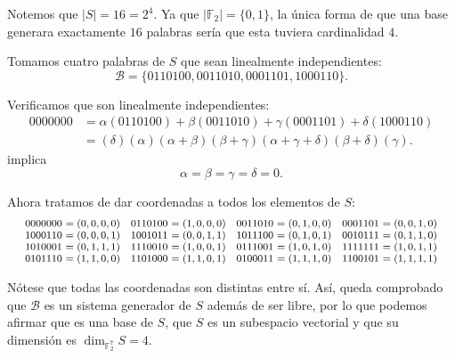 Notemos que $|S| = 16 = 2^4$. Ya que $|\mathbb{F}_2| = \{0, 1\}$, la única forma de que una base generara exactamente $16$ palabras sería que esta tuviera cardinalidad $4$.

Tomamos cuatro palabras de $S$ que sean linealmente independientes:
\[\mathcal{B} = \{0110100, 0011010, 0001101, 1000110\}.\]

Verificamos que son linealmente independientes:
\begin{align*}
	0000000 &= \alpha(0110100) + \beta(0011010) + \gamma(0001101) + \delta(1000110)\\
	&= (\delta)(\alpha)(\alpha+\beta)(\beta+\gamma)(\alpha+\gamma+\delta)(\beta+\delta)(\gamma).
\end{align*}
implica
\[\alpha=\beta=\gamma=\delta=0.\]

Ahora tratamos de dar coordenadas a todos los elementos de $S$:
\[
	\footnotesize
	\begin{array}{r@{\ }l@{\quad}r@{\ }l@{\quad}r@{\ }l@{\quad}r@{\ }l}
		0000000&=(0,0,0,0) & 0110100&=(1,0,0,0) & 0011010&=(0,1,0,0) & 0001101&=(0,0,1,0)\\
		1000110&=(0,0,0,1) & 1001011&=(0,0,1,1) & 1011100&=(0,1,0,1) & 0010111&=(0,1,1,0)\\
		1010001&=(0,1,1,1) & 1110010&=(1,0,0,1) & 0111001&=(1,0,1,0) & 1111111&=(1,0,1,1)\\
		0101110&=(1,1,0,0) & 1101000&=(1,1,0,1) & 0100011&=(1,1,1,0) & 1100101&=(1,1,1,1)
	\end{array}
\]

Nótese que todas las coordenadas son distintas entre sí. Así, queda comprobado que $\mathcal{B}$ es un sistema generador de $S$ además de ser libre, por lo que podemos afirmar que es una base de $S$, que $S$ es un subespacio vectorial y que su dimensión es $\dim_{\mathbb{F}_2^7}S = 4$.